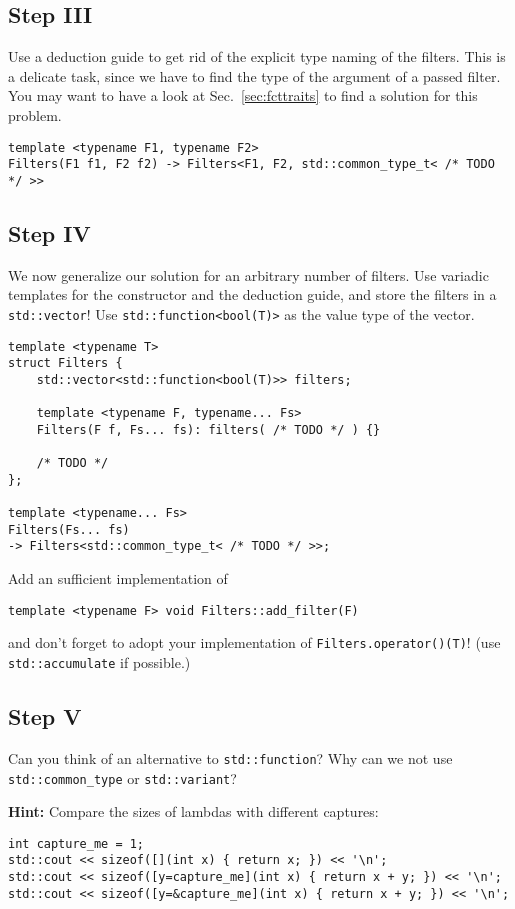 \subsection{Step III}
Use a deduction guide to get rid of the explicit type naming of the filters. This is a delicate task, since we have to find the type of the argument of a passed filter. You may want to have a look at Sec.~\ref{sec:fcttraits} to find a solution for this problem.
\begin{lstlisting}
template <typename F1, typename F2>
Filters(F1 f1, F2 f2) -> Filters<F1, F2, std::common_type_t< /* TODO */ >>
\end{lstlisting}

\subsection{Step IV}
We now generalize our solution for an arbitrary number of filters. Use variadic templates for the constructor and the deduction guide, and store the filters in a \texttt{std::vector}! Use \texttt{std::function<bool(T)>} as the value type of the vector.

\begin{lstlisting}
template <typename T>
struct Filters {
    std::vector<std::function<bool(T)>> filters;

    template <typename F, typename... Fs>
    Filters(F f, Fs... fs): filters( /* TODO */ ) {}
    
    /* TODO */
};

template <typename... Fs>
Filters(Fs... fs)
-> Filters<std::common_type_t< /* TODO */ >>;
\end{lstlisting}
Add an sufficient implementation of
\begin{lstlisting}
template <typename F> void Filters::add_filter(F)
\end{lstlisting}
and don't forget to adopt your implementation of \texttt{Filters.operator()(T)}! (use \texttt{std::accumulate} if possible.)

\subsection{Step V}
Can you think of an alternative to \texttt{std::function}? Why can we not use \texttt{std::common\_type} or \texttt{std::variant}?

\textbf{Hint:} Compare the sizes of lambdas with different captures:
\begin{lstlisting}[title=\href{https://godbolt.org/z/ZBUfgY}{\texttt{godbolt.org/z/ZBUfgY}}]
int capture_me = 1;
std::cout << sizeof([](int x) { return x; }) << '\n';
std::cout << sizeof([y=capture_me](int x) { return x + y; }) << '\n';
std::cout << sizeof([y=&capture_me](int x) { return x + y; }) << '\n';
\end{lstlisting}

